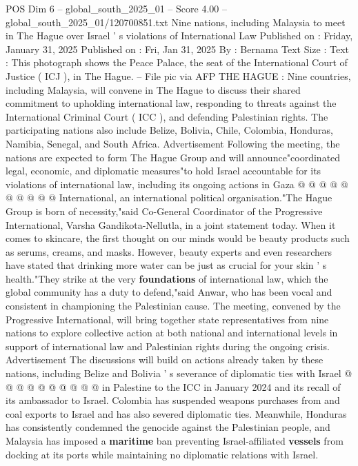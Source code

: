 \begin{textsample}{POS Dim 6 – global\_south\_2025\_01 – Score 4.00 – global\_south\_2025\_01/120700851.txt}  \label{ex:f6_pos_444}
Nine nations, including Malaysia to meet in The Hague over Israel ' s violations of International Law Published on : Friday, January 31, 2025 Published on : Fri, Jan 31, 2025 By : Bernama Text Size : Text : This photograph shows the Peace Palace, the seat of the International Court of Justice ( ICJ ), in The Hague. -- File pic via AFP THE HAGUE : Nine countries, including Malaysia, will convene in The Hague to discuss their shared commitment to upholding international law, responding to threats against the International Criminal Court ( ICC ), and defending Palestinian rights.
The participating nations also include Belize, Bolivia, Chile, Colombia, Honduras, Namibia, Senegal, and South Africa.
Advertisement Following the meeting, the nations are expected to form The Hague Group and will announce"coordinated legal, economic, and diplomatic measures"to hold Israel accountable for its violations of international law, including its ongoing actions in Gaza @ @ @ @ @ @ @ @ @ @ International, an international political organisation."The Hague Group is born of necessity,"said Co-General Coordinator of the Progressive International, Varsha Gandikota-Nellutla, in a joint statement today.
When it comes to skincare, the first thought on our minds would be beauty products such as serums, creams, and masks.
However, beauty experts and even researchers have stated that drinking more water can be just as crucial for your skin ' s health."They strike at the very \textbf{foundations} of international law, which the global community has a duty to defend,"said Anwar, who has been vocal and consistent in championing the Palestinian cause.
The meeting, convened by the Progressive International, will bring together state representatives from nine nations to explore collective action at both national and international levels in support of international law and Palestinian rights during the ongoing crisis.
Advertisement The discussions will build on actions already taken by these nations, including Belize and Bolivia ' s severance of diplomatic ties with Israel @ @ @ @ @ @ @ @ @ @ in Palestine to the ICC in January 2024 and its recall of its ambassador to Israel.
Colombia has suspended weapons purchases from and coal exports to Israel and has also severed diplomatic ties.
Meanwhile, Honduras has consistently condemned the genocide against the Palestinian people, and Malaysia has imposed a \textbf{maritime} ban preventing Israel-affiliated \textbf{vessels} from docking at its ports while maintaining no diplomatic relations with Israel.

\end{textsample}
